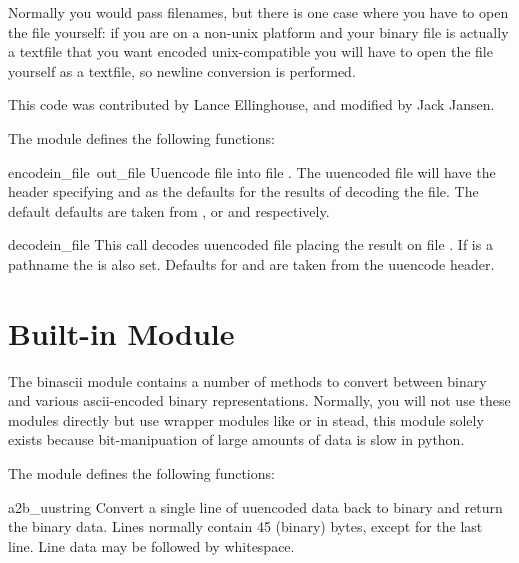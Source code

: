 Normally you would pass filenames, but there is one case where you
have to open the file yourself: if you are on a non-unix platform and
your binary file is actually a textfile that you want encoded
unix-compatible you will have to open the file yourself as a textfile,
so newline conversion is performed.

This code was contributed by Lance Ellinghouse, and modified by Jack
Jansen.

The  module defines the following functions:

\renewcommand{\indexsubitem}{(in module uu)}

\begin{funcdesc}{encode}{in_file\, out_file}
Uuencode file  into file .  The uuencoded
file will have the header specifying  and  as the
defaults for the results of decoding the file. The default defaults
are taken from , or  and 
respectively. 
\end{funcdesc}

\begin{funcdesc}{decode}{in_file}
This call decodes uuencoded file  placing the result on
file . If  is a pathname the  is
also set. Defaults for  and  are taken from
the uuencode header.
\end{funcdesc}

\section{Built-in Module }	%

The binascii module contains a number of methods to convert between
binary and various ascii-encoded binary representations. Normally, you
will not use these modules directly but use wrapper modules like
 or  in stead, this module solely exists because
bit-manipuation of large amounts of data is slow in python.

The  module defines the following functions:

\renewcommand{\indexsubitem}{(in module binascii)}

\begin{funcdesc}{a2b_uu}{string}
Convert a single line of uuencoded data back to binary and return the
binary data. Lines normally contain 45 (binary) bytes, except for the
last line. Line data may be followed by whitespace.
\end{funcdesc}

